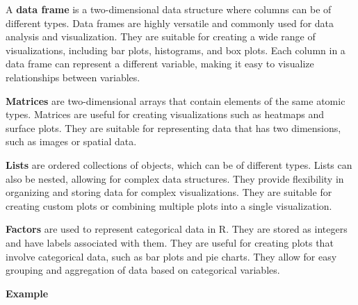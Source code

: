 \documentclass[
]{book}
\begin{document}
A \textbf{data frame} is a two-dimensional data structure where columns can be of different types. Data frames are highly versatile and commonly used for data analysis and visualization. They are suitable for creating a wide range of visualizations, including bar plots, histograms, and box plots. Each column in a data frame can represent a different variable, making it easy to visualize relationships between variables.

\textbf{Matrices} are two-dimensional arrays that contain elements of the same atomic types. Matrices are useful for creating visualizations such as heatmaps and surface plots. They are suitable for representing data that has two dimensions, such as images or spatial data.

\textbf{Lists} are ordered collections of objects, which can be of different types. Lists can also be nested, allowing for complex data structures. They provide flexibility in organizing and storing data for complex visualizations. They are suitable for creating custom plots or combining multiple plots into a single visualization.

\textbf{Factors} are used to represent categorical data in R. They are stored as integers and have labels associated with them. They are useful for creating plots that involve categorical data, such as bar plots and pie charts. They allow for easy grouping and aggregation of data based on categorical variables.

\textbf{Example}
\end{document}
